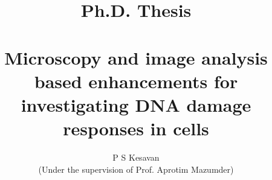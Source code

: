 \usepackage{titling}
\renewcommand\maketitlehooka{\null\mbox{}\vfill}
\renewcommand\maketitlehookd{\vfill\null}
\begin{titlepage}
\title{{Ph.D. Thesis}\\{\vspace{-0.29em} \hrulefill\\} \textbf{Microscopy and image analysis based enhancements for investigating DNA damage responses in cells}}
\author{P S Kesavan\\ {\vspace{6em}(Under the supervision of Prof. Aprotim Mazumder)}}
\date{}
\end{titlepage}

